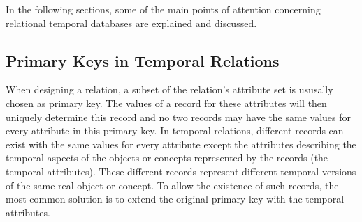 
	
	
	


In the following sections, some of the main points of attention concerning relational temporal databases are explained and discussed.

\subsection{\label{subsubsec:primary-key}Primary Keys in Temporal Relations}
When designing a relation, a subset of the relation's attribute set is ususally chosen as primary key. The values of a record for these attributes will then uniquely determine this record and no two records may have the same values for every attribute in this primary key. In temporal relations, different records can exist with the same values for every attribute except the attributes describing the temporal aspects of the objects or concepts represented by the records (the temporal attributes). These different records represent different temporal versions of the same real object or concept. To allow the existence of such records, the most common solution is to extend the original primary key with the temporal attributes.

